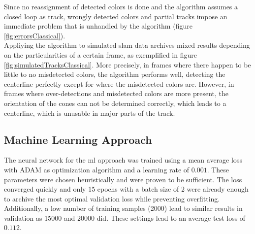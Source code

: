 Since no reassignment of detected colors is done and the algorithm assumes a closed loop as track, wrongly detected colors and partial tracks impose an immediate problem that is unhandled by the algorithm (figure \ref{fig:errorsClassical}).
\\Appliying the algorithm to simulated \ac{slam} data archives mixed results depending on the particularities of a certain frame, as exemplified in figure \ref{fig:simulatedTracksClassical}. More precisely, in frames where there happen to be little to no misdetected colors, the algorithm performs well, detecting the centerline perfectly except for where the misdetected colors are. However, in frames where over-detections and misdetected colors are more present, the orientation of the cones can not be determined correctly, which leads to a centerline, which is unusable in major parts of the track. 

\subsection{Machine Learning Approach}
The neural network for the \ac{ml} approach was trained using a mean average loss with ADAM as optimization algorithm and a learning rate of $0.001$. These parameters were chosen heuristically and were proven to be sufficient. The loss converged quickly and only 15 epochs with a batch size of 2 were already enough to archive the most optimal validation loss while preventing overfitting. Additionally, a low number of training samples (2000) lead to similar results in validation as 15000 and 20000 did. These settings lead to an average test loss of $0.112$.

